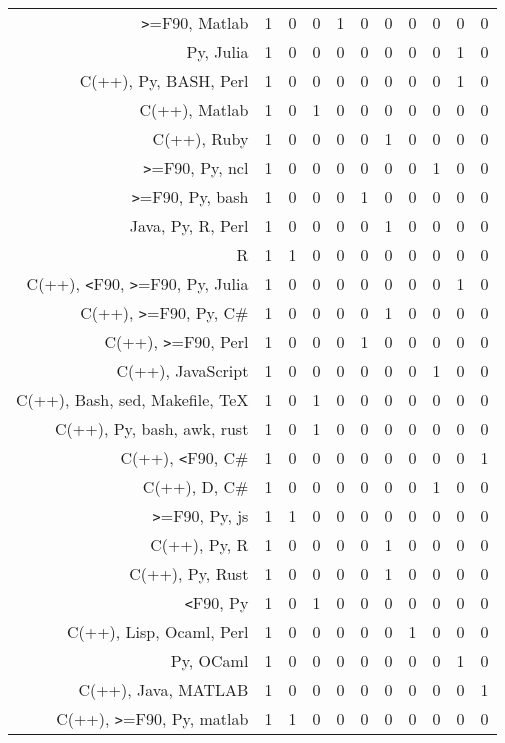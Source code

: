 {\begin{landscape}
\begin{longtable}[htb]{r|c|c|c|c|c|c|c|c|c|c}
{\verb!>!=F90, Matlab} & 1 & 0 & 0 & 1 & 0 & 0 & 0 & 0 & 0 & 0 \\%
{Py, Julia} & 1 & 0 & 0 & 0 & 0 & 0 & 0 & 0 & 1 & 0 \\%
{C(++), Py, BASH, Perl} & 1 & 0 & 0 & 0 & 0 & 0 & 0 & 0 & 1 & 0 \\%
{C(++), Matlab} & 1 & 0 & 1 & 0 & 0 & 0 & 0 & 0 & 0 & 0 \\%
{C(++), Ruby} & 1 & 0 & 0 & 0 & 0 & 1 & 0 & 0 & 0 & 0 \\%
{\verb!>!=F90, Py, ncl} & 1 & 0 & 0 & 0 & 0 & 0 & 0 & 1 & 0 & 0 \\%
{\verb!>!=F90, Py, bash} & 1 & 0 & 0 & 0 & 1 & 0 & 0 & 0 & 0 & 0 \\%
{Java, Py, R, Perl} & 1 & 0 & 0 & 0 & 0 & 1 & 0 & 0 & 0 & 0 \\%
{R} & 1 & 1 & 0 & 0 & 0 & 0 & 0 & 0 & 0 & 0 \\%
{C(++), \verb!<!F90, \verb!>!=F90, Py, Julia} & 1 & 0 & 0 & 0 & 0 & 0 & 0 & 0 & 1 & 0 \\%
{C(++), \verb!>!=F90, Py, C\#} & 1 & 0 & 0 & 0 & 0 & 1 & 0 & 0 & 0 & 0 \\%
{C(++), \verb!>!=F90, Perl} & 1 & 0 & 0 & 0 & 1 & 0 & 0 & 0 & 0 & 0 \\%
{C(++), JavaScript} & 1 & 0 & 0 & 0 & 0 & 0 & 0 & 1 & 0 & 0 \\%
{C(++), Bash, sed, Makefile, TeX} & 1 & 0 & 1 & 0 & 0 & 0 & 0 & 0 & 0 & 0 \\%
{C(++), Py, bash, awk, rust} & 1 & 0 & 1 & 0 & 0 & 0 & 0 & 0 & 0 & 0 \\%
{C(++), \verb!<!F90, C\#} & 1 & 0 & 0 & 0 & 0 & 0 & 0 & 0 & 0 & 1 \\%
{C(++), D, C\#} & 1 & 0 & 0 & 0 & 0 & 0 & 0 & 1 & 0 & 0 \\%
{\verb!>!=F90, Py, js} & 1 & 1 & 0 & 0 & 0 & 0 & 0 & 0 & 0 & 0 \\%
{C(++), Py, R} & 1 & 0 & 0 & 0 & 0 & 1 & 0 & 0 & 0 & 0 \\%
{C(++), Py, Rust} & 1 & 0 & 0 & 0 & 0 & 1 & 0 & 0 & 0 & 0 \\%
{\verb!<!F90, Py} & 1 & 0 & 1 & 0 & 0 & 0 & 0 & 0 & 0 & 0 \\%
{C(++), Lisp, Ocaml, Perl} & 1 & 0 & 0 & 0 & 0 & 0 & 1 & 0 & 0 & 0 \\%
{Py, OCaml} & 1 & 0 & 0 & 0 & 0 & 0 & 0 & 0 & 1 & 0 \\%
{C(++), Java, MATLAB} & 1 & 0 & 0 & 0 & 0 & 0 & 0 & 0 & 0 & 1 \\%
{C(++), \verb!>!=F90, Py, matlab} & 1 & 1 & 0 & 0 & 0 & 0 & 0 & 0 & 0 & 0 \\%

\end{longtable}
\end{landscape}}
